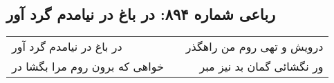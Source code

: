 \begin{center}
\section*{رباعی شماره ۸۹۴: در باغ در نیامدم گرد آور}
\label{sec:0894}
\begin{longtable}{l p{0.5cm} r}
در باغ در نیامدم گرد آور
&&
درویش و تهی روم من راهگذر
\\
خواهی که برون روم مرا بگشا در
&&
ور نگشائی گمان بد نیز مبر
\\
\end{longtable}
\end{center}
